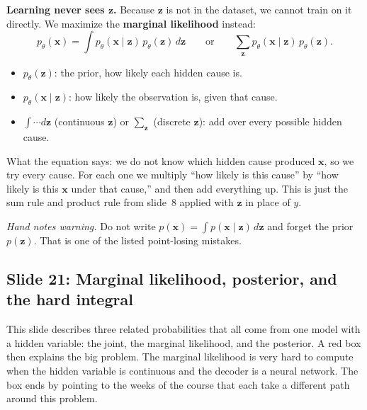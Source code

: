 \textbf{Learning never sees $\mathbf{z}$.} Because $\mathbf{z}$ is not in the dataset, we cannot train on it directly. We maximize the \textbf{marginal likelihood} instead:
\[
p_\theta(\mathbf{x})=\int p_\theta(\mathbf{x}\mid\mathbf{z})\,p_\theta(\mathbf{z})\,d\mathbf{z}
\qquad\text{or}\qquad
\sum_{\mathbf{z}}p_\theta(\mathbf{x}\mid\mathbf{z})\,p_\theta(\mathbf{z}).
\]
\begin{itemize}
\item $p_\theta(\mathbf{z})$: the prior, how likely each hidden cause is.
\item $p_\theta(\mathbf{x}\mid\mathbf{z})$: how likely the observation is, given that cause.
\item $\int\cdots d\mathbf{z}$ (continuous $\mathbf{z}$) or $\sum_{\mathbf{z}}$ (discrete $\mathbf{z}$): add over every possible hidden cause.
\end{itemize}
What the equation says: we do not know which hidden cause produced $\mathbf{x}$, so we try every cause. For each one we multiply ``how likely is this cause'' by ``how likely is this $\mathbf{x}$ under that cause,'' and then add everything up. This is just the sum rule and product rule from slide~8 applied with $\mathbf{z}$ in place of $y$.

\textit{Hand notes warning.} Do not write $p(\mathbf{x})=\int p(\mathbf{x}\mid\mathbf{z})\,d\mathbf{z}$ and forget the prior $p(\mathbf{z})$. That is one of the listed point-losing mistakes.

\subsection*{Slide 21: Marginal likelihood, posterior, and the hard integral}

This slide describes three related probabilities that all come from one model with a hidden variable: the joint, the marginal likelihood, and the posterior. A red box then explains the big problem. The marginal likelihood is very hard to compute when the hidden variable is continuous and the decoder is a neural network. The box ends by pointing to the weeks of the course that each take a different path around this problem.

